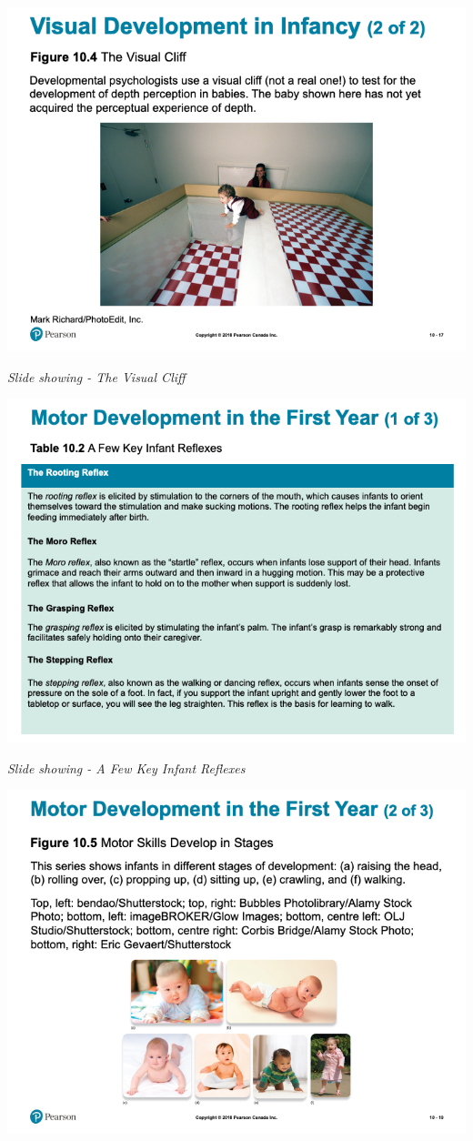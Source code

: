 \documentclass[
]{book}
\begin{document}
\includegraphics{assets/unit_3/slide_17.png}

\emph{Slide showing - The Visual Cliff}

\includegraphics{assets/unit_3/slide_18.png}

\emph{Slide showing - A Few Key Infant Reflexes}

\includegraphics{assets/unit_3/slide_19.png}
\end{document}
